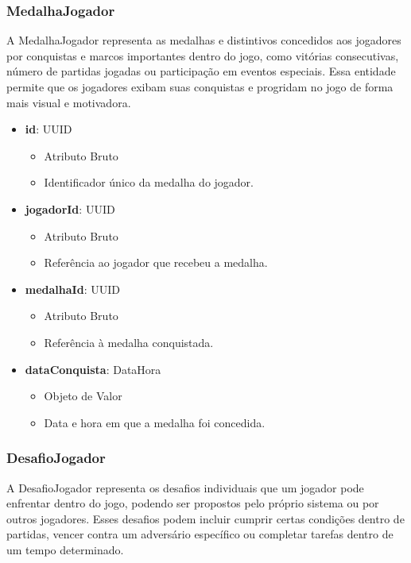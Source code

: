     
    \subsubsection{MedalhaJogador}
    A MedalhaJogador representa as medalhas e distintivos concedidos aos jogadores por conquistas e marcos importantes dentro do jogo, como vitórias consecutivas, número de partidas jogadas ou participação em eventos especiais. Essa entidade permite que os jogadores exibam suas conquistas e progridam no jogo de forma mais visual e motivadora.
    \begin{itemize}
        \item \textbf{id}: UUID  
              \begin{itemize}
                  \item Atributo Bruto
                  \item Identificador único da medalha do jogador.
              \end{itemize}
    
        \item \textbf{jogadorId}: UUID  
              \begin{itemize}
                  \item Atributo Bruto
                  \item Referência ao jogador que recebeu a medalha.
              \end{itemize}
    
        \item \textbf{medalhaId}: UUID  
              \begin{itemize}
                  \item Atributo Bruto
                  \item Referência à medalha conquistada.
              \end{itemize}
    
        \item \textbf{dataConquista}: DataHora  
              \begin{itemize}
                  \item Objeto de Valor
                  \item Data e hora em que a medalha foi concedida.
              \end{itemize}
    \end{itemize}

    \subsubsection{DesafioJogador}
    A DesafioJogador representa os desafios individuais que um jogador pode enfrentar dentro do jogo, podendo ser propostos pelo próprio sistema ou por outros jogadores. Esses desafios podem incluir cumprir certas condições dentro de partidas, vencer contra um adversário específico ou completar tarefas dentro de um tempo determinado.

